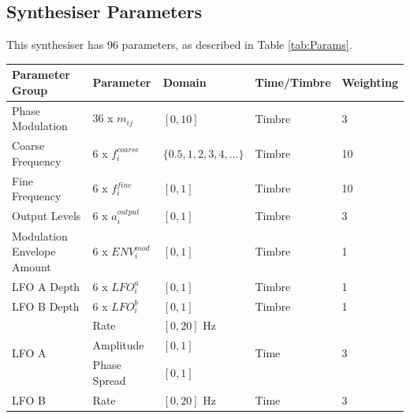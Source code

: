 \documentclass[11pt, oneside]{report}   	%
\begin{document}
\subsection{Synthesiser Parameters}
This synthesiser has 96 parameters, as described in Table \ref{tab:Params}.

\def\arraystretch{1.5}
\begin{table}[]
	\hspace{-2em}
	\begin{tabular}{|l|l|l|l|l|}
		\hline
		\textbf{Parameter Group}                	 & \textbf{Parameter}     & \textbf{Domain}            & \textbf{Time/Timbre} & \textbf{Weighting} \\ \hline
		Phase Modulation         						& 36 x $m_{ij}$               & $[0, 10]$                  		& Timbre                	& 3									\\ \hline
		Coarse Frequency                            	& 6 x $f_{i}^{coarse}$     & $\{0.5, 1, 2, 3, 4, ...\}$ & Timbre                	& 10									  \\ \hline
		Fine Frequency                                 	   & 6 x $f_{i}^{fine}$         & $[0, 1]$                   		& Timbre                	& 10									  \\ \hline
		Output Levels                                  		& 6 x $a_{i}^{output}$     & $[0, 1]$                   	  & Timbre                	& 3								    	\\ \hline
Modulation Envelope Amount                       & 6 x $ENV_{i}^{mod}$   & $[0, 1]$                   	     & Timbre                  & 1									  \\ \hline
		LFO A Depth                                    		& 6 x $LFO_{i}^{a}$         & $[0, 1]$                   	   & Timbre                  & 1									\\ \hline
		LFO B Depth                                    		& 6 x $LFO_{i}^{b}$        & $[0, 1]$                   	   & Timbre                  & 1									\\ \hline
		\multirow{3}{*}{LFO A}      					& Rate                    		& $[0, 20]$ Hz               	 & \multirow{3}{*}{Time}& \multirow{3}{*}{3} \\
																	  & Amplitude               	& $[0, 1]$                   		&                      				& \\
																	  & Phase Spread         	& $[0, 1]$                   		&                       			&\\ \hline
		\multirow{3}{*}{LFO B}      					& Rate                    		& $[0, 20]$ Hz               	& \multirow{3}{*}{Time}& \multirow{3}{*}{3} \\

\end{tabular}
\end{table}
\end{document}
